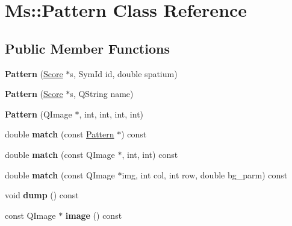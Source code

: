 \hypertarget{class_ms_1_1_pattern}{}\section{Ms\+:\+:Pattern Class Reference}
\label{class_ms_1_1_pattern}
\subsection*{Public Member Functions}
\begin{DoxyCompactItemize}
\item 
\mbox{\label{class_ms_1_1_pattern_a96b5ff868e3cd3ccae3a57d69c47659c}} 
{\bfseries Pattern} (\hyperlink{class_ms_1_1_score}{Score} $\ast$s, Sym\+Id id, double spatium)
\item 
\mbox{\label{class_ms_1_1_pattern_ab80baeede862daddb13548030ecf528c}} 
{\bfseries Pattern} (\hyperlink{class_ms_1_1_score}{Score} $\ast$s, Q\+String name)
\item 
\mbox{\label{class_ms_1_1_pattern_a9cd0ec3d86c9d745c709cc9a6fd5ea04}} 
{\bfseries Pattern} (Q\+Image $\ast$, int, int, int, int)
\item 
\mbox{\label{class_ms_1_1_pattern_a777a9ac4112c9e89bba6026080c2b4e2}} 
double {\bfseries match} (const \hyperlink{class_ms_1_1_pattern}{Pattern} $\ast$) const
\item 
\mbox{\label{class_ms_1_1_pattern_a9baa339a2a386aced3965f699e1ac9a2}} 
double {\bfseries match} (const Q\+Image $\ast$, int, int) const
\item 
\mbox{\label{class_ms_1_1_pattern_a282415150c8f700c933f9f6eeeb8aad3}} 
double {\bfseries match} (const Q\+Image $\ast$img, int col, int row, double bg\+\_\+parm) const
\item 
\mbox{\label{class_ms_1_1_pattern_a6881d087ffcf7cd7cff9ae8a2937c38a}} 
void {\bfseries dump} () const
\item 
\mbox{\label{class_ms_1_1_pattern_abee81cf28dc95de8e4e01082b5edd8bb}} 
const Q\+Image $\ast$ {\bfseries image} () const

\end{DoxyCompactItemize}
